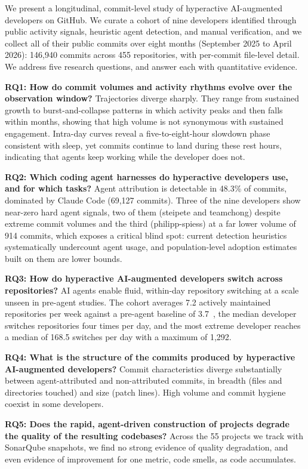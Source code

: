 \documentclass[smallextended]{svjour3}
\begin{document}
We present a longitudinal, commit-level study of hyperactive AI-augmented developers on GitHub.
We curate a cohort of nine developers identified through public activity signals, heuristic agent detection, and manual verification, and we collect all of their public commits over eight months (September 2025 to April 2026): 146,940 commits across 455 repositories, with per-commit file-level detail.
We address five research questions, and answer each with quantitative evidence.

\textbf{RQ1: How do commit volumes and activity rhythms evolve over the observation window?}
Trajectories diverge sharply.
They range from sustained growth to burst-and-collapse patterns in which activity peaks and then falls within months, showing that high volume is not synonymous with sustained engagement.
Intra-day curves reveal a five-to-eight-hour slowdown phase consistent with sleep, yet commits continue to land during these rest hours, indicating that agents keep working while the developer does not.

\textbf{RQ2: Which coding agent harnesses do hyperactive developers use, and for which tasks?}
Agent attribution is detectable in 48.3\% of commits, dominated by Claude Code (69,127 commits).
Three of the nine developers show near-zero hard agent signals, two of them (steipete and teamchong) despite extreme commit volumes and the third (philipp-spiess) at a far lower volume of 914 commits, which exposes a critical blind spot: current detection heuristics systematically undercount agent usage, and population-level adoption estimates built on them are lower bounds.

\textbf{RQ3: How do hyperactive AI-augmented developers switch across repositories?}
AI agents enable fluid, within-day repository switching at a scale unseen in pre-agent studies.
The cohort averages 7.2 actively maintained repositories per week against a pre-agent baseline of 3.7~\cite{Vasilescu2016sky}, the median developer switches repositories four times per day, and the most extreme developer reaches a median of 168.5 switches per day with a maximum of 1,292.

\textbf{RQ4: What is the structure of the commits produced by hyperactive AI-augmented developers?}
Commit characteristics diverge substantially between agent-attributed and non-attributed commits, in breadth (files and directories touched) and size (patch lines).
High volume and commit hygiene coexist in some developers.

\textbf{RQ5: Does the rapid, agent-driven construction of projects degrade the quality of the resulting codebases?}
Across the 55 projects we track with SonarQube snapshots, we find no strong evidence of quality degradation, and even evidence of improvement for one metric, code smells, as code accumulates.
\end{document}
